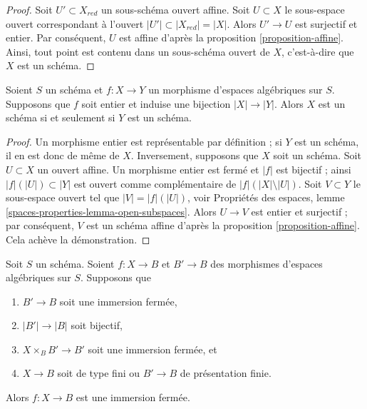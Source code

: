 \begin{proof}
Soit $U' \subset X_{red}$ un sous-schéma ouvert affine.
Soit $U \subset X$ le sous-espace ouvert correspondant à l'ouvert
$|U'| \subset |X_{red}| = |X|$. Alors $U' \to U$ est surjectif et
entier. Par conséquent, $U$ est affine d'après la
proposition \ref{proposition-affine}.
Ainsi, tout point est contenu dans un sous-schéma ouvert de $X$, c'est-à-dire que
$X$ est un schéma.
\end{proof}

\begin{lemma}
\label{lemma-integral-universally-bijective-scheme}
Soient $S$ un schéma et $f : X \to Y$ un morphisme d'espaces algébriques
sur $S$. Supposons que $f$ soit entier et induise une bijection $|X| \to |Y|$.
Alors $X$ est un schéma si et seulement si $Y$ est un schéma.
\end{lemma}

\begin{proof}
Un morphisme entier est représentable par définition ; si $Y$
est un schéma, il en est donc de même de $X$. Inversement, supposons que $X$ soit un schéma.
Soit $U \subset X$ un ouvert affine. Un morphisme entier est
fermé et $|f|$ est bijectif ; ainsi $|f|(|U|) \subset |Y|$
est ouvert comme complémentaire de $|f|(|X| \setminus |U|)$. Soit
$V \subset Y$ le sous-espace ouvert tel que $|V| = |f|(|U|)$, voir
Propriétés des espaces, lemme \ref{spaces-properties-lemma-open-subspaces}.
Alors $U \to V$ est entier et surjectif ; par conséquent,
$V$ est un schéma affine d'après la proposition \ref{proposition-affine}.
Cela achève la démonstration.
\end{proof}

\begin{lemma}
\label{lemma-check-closed-infinitesimally}
Soit $S$ un schéma.
Soient $f : X \to B$ et $B' \to B$ des morphismes d'espaces algébriques sur $S$.
Supposons que
\begin{enumerate}
\item $B' \to B$ soit une immersion fermée,
\item $|B'| \to |B|$ soit bijectif,
\item $X \times_B B' \to B'$ soit une immersion fermée, et
\item $X \to B$ soit de type fini ou $B' \to B$ de présentation finie.
\end{enumerate}
Alors $f : X \to B$ est une immersion fermée.
\end{lemma}

